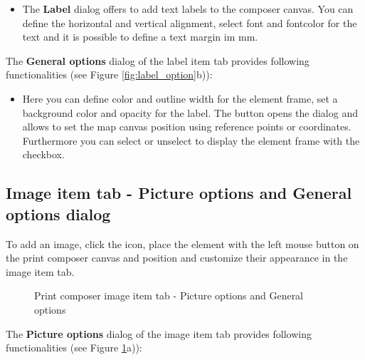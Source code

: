 \begin{itemize}[label=--]
\item The \textbf{Label} dialog offers to add text labels to the composer
canvas. You can define the horizontal and vertical alignment, select font 
and fontcolor for the text and it is possible to define a text margin im mm.
\end{itemize}


The \textbf{General options} dialog of the label item tab provides following
functionalities (see Figure \ref{fig:label_option}b)):

\begin{itemize}[label=--]
\item Here you can define color and outline width for the element frame, set
a background color and opacity for the label. The 
button opens the  dialog and allows to set the map
canvas position using reference points or coordinates. Furthermore you can
select or unselect to display the element frame with the  checkbox.
\end{itemize}

\subsection{Image item tab - Picture options and General options dialog}

To add an image, click the 
icon, place the element with the left mouse button on the print composer
canvas and position and customize their appearance in the image item tab.

\begin{figure}[ht]
\centering
     \hspace{1cm}
   \caption{Print composer image item tab - Picture options and General options \nixcaption}\label{fig:imageoptions}
\end{figure}


The \textbf{Picture options} dialog of the image item tab provides following
functionalities (see Figure \ref{fig:imageoptions}a)):

